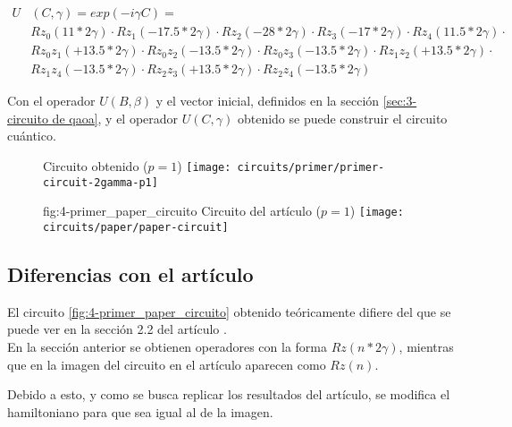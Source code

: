 \begin{align*}
  U&(C, \gamma) = exp(-i \gamma C) = &&\\
   &Rz_0(11*2\gamma) \cdot Rz_1(-17.5*2\gamma) \cdot Rz_2(-28*2\gamma) \cdot Rz_3(-17*2\gamma) \cdot Rz_4(11.5*2\gamma) \cdot \\
   &Rz_0z_1(+13.5 * 2\gamma) \cdot Rz_0z_2(-13.5 * 2\gamma) \cdot Rz_0z_3(-13.5 * 2\gamma) \cdot Rz_1z_2(+13.5 * 2\gamma) \cdot \\
   &Rz_1z_4(-13.5 * 2\gamma) \cdot Rz_2z_3(+13.5 * 2\gamma) \cdot Rz_2z_4(-13.5 * 2\gamma)
\end{align*}

Con el operador \(U(B, \beta)\) y el vector inicial, definidos en la sección \ref{sec:3-circuito de qaoa}, y el operador \(U(C, \gamma)\) obtenido se puede construir el circuito cuántico.

\begin{figure}[htbp]{}{ Circuito obtenido ($p=1$) }
  \centering
  \texttt{[image: circuits/primer/primer-circuit-2gamma-p1]}
\end{figure}

\begin{figure}[htbp]{fig:4-primer_paper_circuito}{ Circuito del artículo ($p=1$) }
  \centering
  \texttt{[image: circuits/paper/paper-circuit]}
\end{figure}

\subsection{Diferencias con el artículo}
El circuito \ref{fig:4-primer_paper_circuito} obtenido teóricamente difiere del que se puede ver en la sección 2.2 del artículo \cite{multi-objective_routing_optimization}. \\
En la sección anterior se obtienen operadores con la forma \(Rz(n*2\gamma)\), mientras que en la imagen del circuito en el artículo aparecen como \(Rz(n)\).

Debido a esto, y como se busca replicar los resultados del artículo, se modifica el hamiltoniano para que sea igual al de la imagen.


